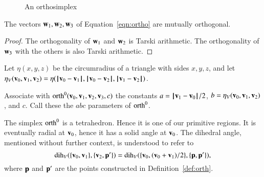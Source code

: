 
\begin{figure}[htb]
\centering
\caption{An orthosimplex}
\end{figure}


\begin{lemma} 
The vectors $\w_1,\w_2,\w_3$ of Equation~\ref{eqn:ortho}
are mutually orthogonal.  %
\end{lemma}

\begin{proof} The orthogonality of $\w_1$ and $\w_2$ is 
Tarski arithmetic. %
The orthogonality of $\w_3$ with the others is also Tarski
arithmetic. %
\end{proof}
%

\begin{definition}\label{def:etaV}
Let $\eta(x,y,z)$ be the circumradius of a triangle with sides
$x,y,z$, and let $\eta_V(\v_0,\v_1,\v_2) =
\eta(\norm{\v_0}{\v_1},\norm{\v_0}{\v_2},\norm{\v_1}{\v_2})$.
%
%
%
\end{definition}

\begin{definition}
Associate with $\op{orth}^0(\v_0,\v_1,\v_2,\v_3,c)$ the constants
$a=\norm{\v_1}{\v_0}/2$, $b=\eta_V(\v_0,\v_1,\v_2)$, and $c$.
Call these the $abc$ parameters of $\op{orth}^0$.
%
%
%
\end{definition}

The simplex $\op{orth}^0$ is a tetrahedron.  Hence it is one of our
primitive regions.  It is eventually radial at $\v_0$, hence
it has a solid angle at $\v_0$.  The dihedral
angle, mentioned without further context, is understood to refer to 
\begin{displaymath}
\dih_V(\{\v_0,\v_1\},\{\v_2,\p'\})=\dih_V(\{\v_0,(\v_0+\v_1)/2\},\{\p,\p'\}),
\end{displaymath}
%
where $\p$ and $\p'$ are the points 
constructed in Definition~\ref{def:orth}.

